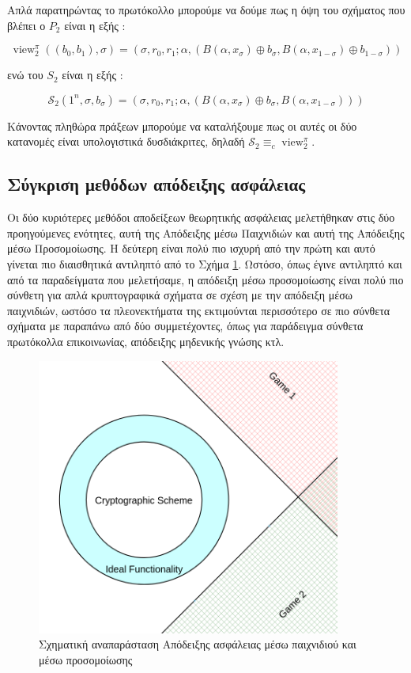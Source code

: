 Απλά παρατηρώντας το πρωτόκολλο μπορούμε να δούμε πως η όψη του σχήματος που βλέπει ο $P_2$ είναι η εξής :

\[
\operatorname{view}_{2}^{\pi}\left(\left(b_{0}, b_{1}\right), \sigma\right)=\left(\sigma, r_{0}, r_{1} ; \alpha,\left(B\left(\alpha, x_{\sigma}\right) \oplus b_{\sigma}, B\left(\alpha, x_{1-\sigma}\right) \oplus b_{1-\sigma}\right)\right)
\]

ενώ του $S_2$ είναι η εξής :

\[
\mathcal{S}_{2}\left(1^{n}, \sigma, b_{\sigma}\right)=\left(\sigma, r_{0}, r_{1} ; \alpha,\left(B\left(\alpha, x_{
\sigma
}\right) \oplus b_{\sigma}, B\left(\alpha, x_{1-\sigma}\right)\right)\right)
\]

Κάνοντας πληθώρα πράξεων μπορούμε να καταλήξουμε πως οι αυτές οι δύο κατανομές είναι υπολογιστικά δυσδιάκριτες, δηλαδή $\mathcal{S}_{2} \equiv_c \operatorname{view}_{2}^{\pi}$.
\subsection{Σύγκριση μεθόδων απόδειξης ασφάλειας}

Οι δύο κυριότερες μεθόδοι αποδείξεων θεωρητικής ασφάλειας μελετήθηκαν στις δύο προηγούμενες ενότητες, αυτή της Απόδειξης μέσω Παιχνιδιών και αυτή της Απόδειξης μέσω Προσομοίωσης. Η δεύτερη είναι πολύ πιο ισχυρή από την πρώτη και αυτό γίνεται πιο διαισθητικά αντιληπτό από το Σχήμα \ref{fig:game_proof_vs_simulation_proof}. Ωστόσο, όπως έγινε αντιληπτό και από τα παραδείγματα που μελετήσαμε, η απόδειξη μέσω προσομοίωσης είναι πολύ πιο σύνθετη για απλά κρυπτογραφικά σχήματα σε σχέση με την απόδειξη μέσω παιχνιδιών, ωστόσο τα πλεονεκτήματα της εκτιμούνται περισσότερο σε πιο σύνθετα σχήματα με παραπάνω από δύο συμμετέχοντες, όπως για παράδειγμα σύνθετα πρωτόκολλα επικοινωνίας, απόδειξης μηδενικής γνώσης κτλ.

\cite{cryptoeprint:2000/067}

\begin{figure}[t]
\includegraphics[width=10cm]{./01_body/images/simulation_vs_game_based_security.png}
\centering
\caption{Σχηματική αναπαράσταση Απόδειξης ασφάλειας μέσω παιχνιδιού και μέσω προσομοίωσης}
\label{fig:game_proof_vs_simulation_proof}
\end{figure}


